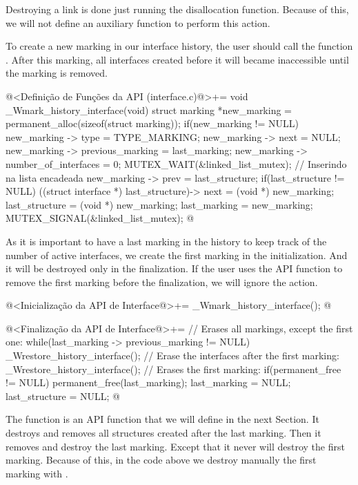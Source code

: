 Destroying a link is done just running the disallocation
function. Because of this, we will not define an auxiliary function to
perform this action.


To create a new marking in our interface history, the user should call
the function . After this
marking, all interfaces created before it will became inaccessible
until the marking is removed.

\iniciocodigo
@<Definição de Funções da API (interface.c)@>+=
void _Wmark_history_interface(void){
  struct marking *new_marking = permanent_alloc(sizeof(struct marking));
  if(new_marking != NULL){
    new_marking -> type = TYPE_MARKING;
    new_marking -> next = NULL;
    new_marking -> previous_marking = last_marking;
    new_marking -> number_of_interfaces = 0;
    MUTEX_WAIT(&linked_list_mutex); // Inserindo na lista encadeada
    new_marking -> prev = last_structure;
    if(last_structure != NULL)
      ((struct interface *) last_structure)-> next = (void *) new_marking;
    last_structure = (void *) new_marking;
    last_marking = new_marking;
    MUTEX_SIGNAL(&linked_list_mutex);
  }
}
@
\fimcodigo

As it is important to have a last marking in the history to keep track
of the number of active interfaces, we create the first marking in the
initialization. And it will be destroyed only in the finalization. If
the user uses the API function to remove the first marking before the
finalization, we will ignore the action.

\iniciocodigo
@<Inicialização da API de Interface@>+=
_Wmark_history_interface();
@
\fimcodigo

\iniciocodigo
@<Finalização da API de Interface@>+=
// Erases all markings, except the first one:
while(last_marking -> previous_marking != NULL){
  _Wrestore_history_interface();
}
// Erase the interfaces after the first marking:
_Wrestore_history_interface();
// Erases the first marking:
if(permanent_free != NULL)
  permanent_free(last_marking);
last_marking = NULL;
last_structure = NULL;
@
\fimcodigo

The function  is an API
function that we will define in the next Section. It destroys and
removes all structures created after the last marking. Then it removes
and destroy the last marking. Except that it never will destroy the
first marking. Because of this, in the code above we destroy manually
the first marking with .

